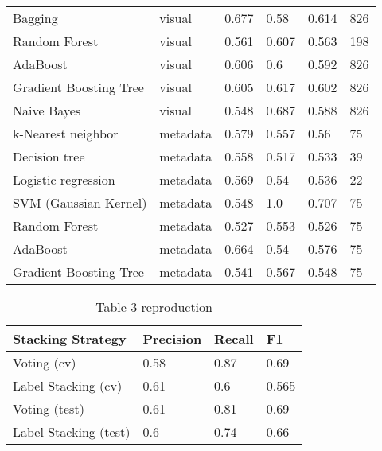 \documentclass[sigconf]{acmart}
\begin{document}
\begin{table}[hbt!]
\begin{tabular}{llllll}
Bagging                & visual   & 0.677     & 0.58   & 0.614 & 826           \\
Random Forest          & visual   & 0.561     & 0.607  & 0.563 & 198           \\
AdaBoost               & visual   & 0.606     & 0.6    & 0.592 & 826           \\
Gradient Boosting Tree & visual   & 0.605     & 0.617  & 0.602 & 826           \\
Naive Bayes            & visual   & 0.548     & 0.687  & 0.588 & 826           \\
k-Nearest neighbor     & metadata & 0.579     & 0.557  & 0.56  & 75            \\
Decision tree          & metadata & 0.558     & 0.517  & 0.533 & 39            \\
Logistic regression    & metadata & 0.569     & 0.54   & 0.536 & 22            \\
SVM (Gaussian Kernel)  & metadata & 0.548     & 1.0    & 0.707 & 75            \\
Random Forest          & metadata & 0.527     & 0.553  & 0.526 & 75            \\
AdaBoost               & metadata & 0.664     & 0.54   & 0.576 & 75            \\
Gradient Boosting Tree & metadata & 0.541     & 0.567  & 0.548 & 75            \\ \hline
\end{tabular}
\end{table}

\begin{table}[hbt!]
\caption*{Table 3 reproduction}
\begin{tabular}{llll}
\hline
Stacking Strategy     & Precision & Recall & F1    \\ \hline
Voting (cv)           & 0.58      & 0.87   & 0.69  \\
Label Stacking (cv)   & 0.61      & 0.6    & 0.565 \\
Voting (test)         & 0.61      & 0.81   & 0.69  \\
Label Stacking (test) & 0.6       & 0.74   & 0.66  \\ \hline
\end{tabular}
\end{table}
\end{document}
